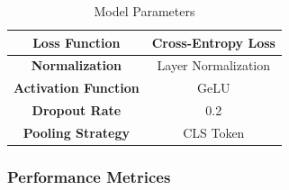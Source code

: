 \begin{table}[h]
\begin{tabular}{|c|c|}
        \hline
        \textbf{Loss Function}                  & Cross-Entropy Loss  \\
        \hline
        \textbf{Normalization}                  & Layer Normalization \\
        \hline
        \textbf{Activation Function}            & GeLU                \\
        \hline
        \textbf{Dropout Rate }                  & 0.2                 \\
        \hline
        \textbf{Pooling Strategy }              & CLS Token           \\
        \hline
    \end{tabular}
    \caption{Model Parameters}
    \label{tab:model-parameters}
\end{table}
\newpage
\subsubsection{Performance Metrices}

